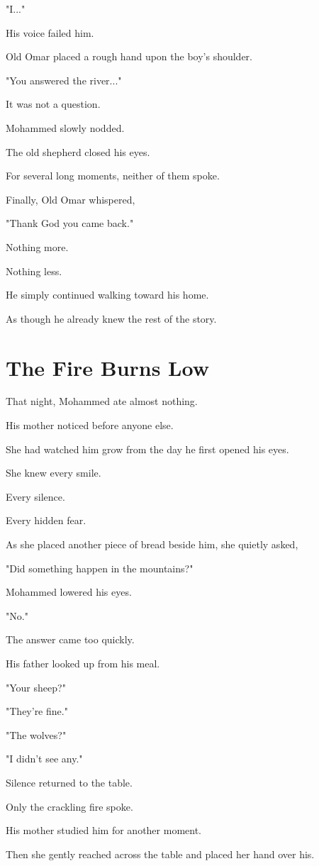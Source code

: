\documentclass[12pt,openany]{book}
\begin{document}
"I..."

His voice failed him.

Old Omar placed a rough hand upon the boy's shoulder.

"You answered the river..."

It was not a question.

Mohammed slowly nodded.

The old shepherd closed his eyes.

For several long moments, neither of them spoke.

Finally, Old Omar whispered,

"Thank God you came back."

Nothing more.

Nothing less.

He simply continued walking toward his home.

As though he already knew the rest of the story.
\section*{The Fire Burns Low}

That night, Mohammed ate almost nothing.

His mother noticed before anyone else.

She had watched him grow from the day he first opened his eyes.

She knew every smile.

Every silence.

Every hidden fear.

As she placed another piece of bread beside him, she quietly asked,

"Did something happen in the mountains?"

Mohammed lowered his eyes.

"No."

The answer came too quickly.

His father looked up from his meal.

"Your sheep?"

"They're fine."

"The wolves?"

"I didn't see any."

Silence returned to the table.

Only the crackling fire spoke.

His mother studied him for another moment.

Then she gently reached across the table and placed her hand over his.
\end{document}
